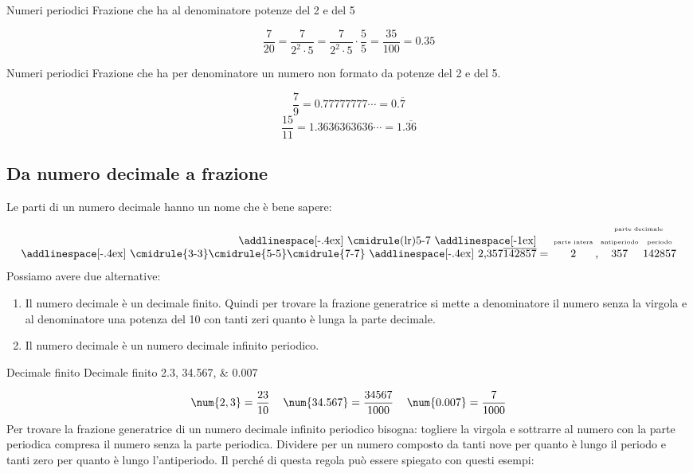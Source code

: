 \begin{esempiot}{Numeri periodici}{}
	Frazione che ha al denominatore potenze del \num{2} e del \num{5}
\end{esempiot}
 \[\dfrac{7}{20}=\dfrac{7}{2^2\cdot 5}=\dfrac{7}{2^2\cdot 5}\cdot\dfrac{5}{5}=\dfrac{35}{100}=\num{0,35}\]
\begin{esempiot}{Numeri periodici}{}
Frazione che ha per denominatore un numero non formato da potenze del \num{2} e del \num{5}.
\end{esempiot}
\[\dfrac{7}{9}=\num{0.77777777}\cdots=0{.}\overline{7}\]\[\dfrac{15}{11}=\num{1,3636363636}\cdots=1{.}\overline{36}\]
\subsection{Da numero decimale a frazione}
Le parti di un numero decimale hanno un nome che è bene sapere:
\[\setlength{\tabcolsep}{1pt}
\begin{tabular}{r@{}cccccc}
&&&&\multicolumn{3}{c}{\tiny parte decimale}\\
\addlinespace[-.4ex]
\cmidrule(lr){5-7}
\addlinespace[-1ex]
&&\tiny parte intera&&\tiny antiperiodo&&\tiny periodo\\
\addlinespace[-.4ex]
\cmidrule{3-3}\cmidrule{5-5}\cmidrule{7-7}
\addlinespace[-.4ex]
$2{,}357\overline{142857}$&${}={}$&$2$&,&$357$&&$142857$
\end{tabular}
\]
Possiamo avere due alternative:
\begin{enumerate}
	\item Il numero decimale è un decimale finito. 
		Quindi per trovare la frazione generatrice si mette a denominatore il numero senza la virgola e al denominatore una potenza del \num{10} con tanti zeri quanto è lunga la parte decimale.
	\item Il numero decimale è un numero decimale infinito periodico. 
\end{enumerate}
\begin{esempiot}{Decimale finito}{}
	Decimale finito \numlist{2,3;34,567;0.007} 
\end{esempiot}
	\[\begin{tabular}{ccc}
	$\num{2,3}=\dfrac{23}{10}$&$\num{34.567}=\dfrac{34567}{1000}$&$\num{0.007}=\dfrac{7}{1000}$
	\end{tabular}\]
	Per trovare la frazione generatrice di un numero decimale infinito periodico bisogna: togliere la virgola e sottrarre al numero con la parte periodica compresa il numero senza la parte periodica. Dividere per un numero composto da tanti nove per quanto è lungo il periodo e tanti zero per quanto è lungo l'antiperiodo. Il perché di questa regola può essere spiegato con questi esempi:
